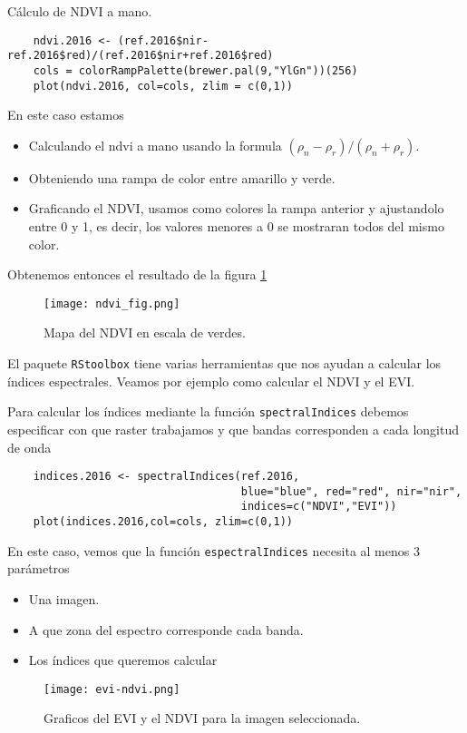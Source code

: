 \begin{exa}
    C\'alculo de NDVI a mano.
    \begin{lstlisting}
    ndvi.2016 <- (ref.2016$nir-ref.2016$red)/(ref.2016$nir+ref.2016$red)
    cols = colorRampPalette(brewer.pal(9,"YlGn"))(256)
    plot(ndvi.2016, col=cols, zlim = c(0,1))
    \end{lstlisting}
    En este caso estamos
    \begin{itemize}
        \item Calculando el ndvi a mano usando la formula $(\rho_n-\rho_r)/(\rho_n+\rho_r)$.
        \item Obteniendo una rampa de color entre amarillo y verde.
        \item Graficando el NDVI, usamos como colores la rampa anterior
            y ajustandolo entre 0 y 1, es decir, los valores menores a 0 se
            mostraran todos del mismo color.
    \end{itemize}
    Obtenemos entonces el resultado de la figura \ref{fig:ndvifig}
    \begin{figure}[h!]
    \begin{center}
        \texttt{[image: ndvi\_fig.png]}
    \end{center}
    \caption{Mapa del NDVI en escala de verdes.}
    \label{fig:ndvifig}
    \end{figure}

\end{exa}

El paquete \texttt{RStoolbox} tiene varias herramientas que nos ayudan a
calcular los \'indices espectrales. Veamos por ejemplo como calcular el NDVI y el
EVI.

\begin{exa}
    Para calcular los \'indices mediante la funci\'on \texttt{spectralIndices} debemos
    especificar con que raster trabajamos y que bandas corresponden a cada
    longitud de onda
    \begin{lstlisting}
    indices.2016 <- spectralIndices(ref.2016,
                                    blue="blue", red="red", nir="nir",
                                    indices=c("NDVI","EVI"))
    plot(indices.2016,col=cols, zlim=c(0,1))
    \end{lstlisting}
    En este caso, vemos que la funci\'on \texttt{espectralIndices} necesita al
    menos 3 par\'ametros
    \begin{itemize}
        \item Una imagen.
        \item A que zona del espectro corresponde cada banda.
        \item Los \'indices que queremos calcular
    \end{itemize}
     \begin{figure}[h!]
     \begin{center}
         \texttt{[image: evi-ndvi.png]}
     \end{center}
     \caption{Graficos del EVI y el NDVI para la imagen seleccionada.}
     \label{fig:evi-ndvi}
     \end{figure}

\end{exa}

